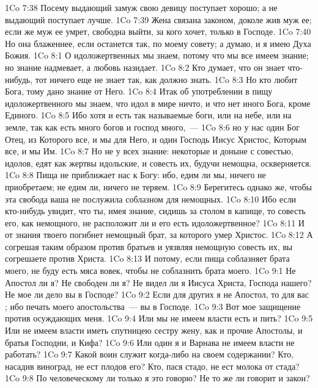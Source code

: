 \vs 1Co 7:38 Посему выдающий замуж свою девицу поступает хорошо; а не выдающий поступает лучше.
\vs 1Co 7:39 Жена связана законом, доколе жив муж ее; если же муж ее умрет, свободна выйти, за кого хочет, только в Господе.
\vs 1Co 7:40 Но она блаженнее, если останется так, по моему совету; а думаю, и я имею Духа Божия.
\vs 1Co 8:1 О идоложертвенных  мы знаем, потому что мы все имеем знание; но знание надмевает, а любовь назидает.
\vs 1Co 8:2 Кто думает, что он знает что-нибудь, тот ничего еще не знает так, как должно знать.
\vs 1Co 8:3 Но кто любит Бога, тому дано знание от Него.
\vs 1Co 8:4 Итак об употреблении в пищу идоложертвенного мы знаем, что идол в мире ничто, и что нет иного Бога, кроме Единого.
\vs 1Co 8:5 Ибо хотя и есть так называемые боги, или на небе, или на земле, так как есть много богов и господ много,~---
\vs 1Co 8:6 но у нас один Бог Отец, из Которого все, и мы для Него, и один Господь Иисус Христос, Которым все, и мы Им.
\vs 1Co 8:7 Но не у всех  знание: некоторые и доныне с совестью,  идолов, едят  как жертвы идольские, и совесть их, будучи немощна, оскверняется.
\vs 1Co 8:8 Пища не приближает нас к Богу: ибо, едим ли мы, ничего не приобретаем; не едим ли, ничего не теряем.
\vs 1Co 8:9 Берегитесь однако же, чтобы эта свобода ваша не послужила соблазном для немощных.
\vs 1Co 8:10 Ибо если кто-нибудь увидит, что ты, имея знание, сидишь за столом в капище, то совесть его, как немощного, не расположит ли и его есть идоложертвенное?
\vs 1Co 8:11 И от знания твоего погибнет немощный брат, за которого умер Христос.
\vs 1Co 8:12 А согрешая таким образом против братьев и уязвляя немощную совесть их, вы согрешаете против Христа.
\vs 1Co 8:13 И потому, если пища соблазняет брата моего, не буду есть мяса вовек, чтобы не соблазнить брата моего.
\vs 1Co 9:1 Не Апостол ли я? Не свободен ли я? Не видел ли я Иисуса Христа, Господа нашего? Не мое ли дело вы в Господе?
\vs 1Co 9:2 Если для других я не Апостол, то для вас ; ибо печать моего апостольства~--- вы в Господе.
\vs 1Co 9:3 Вот мое защищение против осуждающих меня.
\vs 1Co 9:4 Или мы не имеем власти есть и пить?
\vs 1Co 9:5 Или не имеем власти иметь спутницею сестру жену, как и прочие Апостолы, и братья Господни, и Кифа?
\vs 1Co 9:6 Или один я и Варнава не имеем власти не работать?
\vs 1Co 9:7 Какой воин служит когда-либо на своем содержании? Кто, насадив виноград, не ест плодов его? Кто, пася стадо, не ест молока от стада?
\vs 1Co 9:8 По человеческому ли только  я это говорю? Не то же ли говорит и закон?
